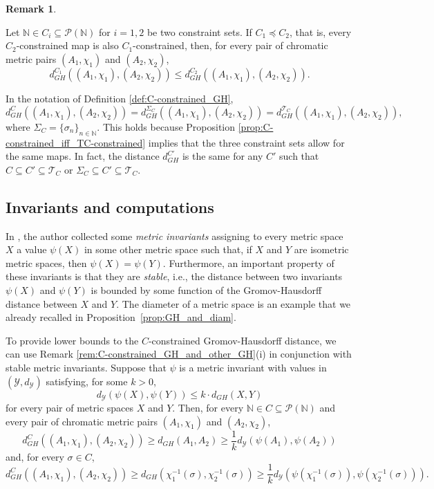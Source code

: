 \documentclass[8pt,a4paper,oneside,english,english]{article}
\theoremstyle{plain}
\theoremstyle
{plain}
\theoremstyle{definition}
\newtheorem{remark}[theorem]{Remark}%
\newcommand{\N}{\mathbb{N}}
\newcommand{\Tau}{\mathcal T}
\newcommand{\GH}{d_{GH}}
\newcommand{\MP}[1]{(A_{#1},\chi_{#1})}
\begin{document}
\begin{remark}
\begin{compactenum}[(i)]
        
        \item Let $\N\in C_i\subseteq\mathcal P(\N)$ for $i=1,2$ be two constraint sets. If $C_1\preceq C_2$, that is, every $C_2$-constrained map is also $C_1$-constrained, then, for every pair of chromatic metric pairs $\MP{1}$ and $\MP{2}$,
        \[
        \GH^{C_1}(\MP{1},\MP{2})\leq\GH^{C_2}(\MP{1},\MP{2}).
        \]
		
        \item 
        In the notation of Definition \ref{def:C-constrained_GH}, 
		\[
    		\GH^C(\MP{1},\MP{2})
            =\GH^{\Sigma_C}(\MP{1},\MP{2})
            =\GH^{\Tau_C}(\MP{1},\MP{2}),
		\]
		where $\Sigma_C=\{\sigma_n\}_{n\in\N}$. This holds because Proposition \ref{prop:C-constrained_iff_TC-constrained} implies that the three constraint sets allow for the same maps. In fact, the distance $\GH^{C'}$ is the same for any $C'$ such that $C\subseteq C' \subseteq \Tau_C$ or $\Sigma_C\subseteq C' \subseteq \Tau_C$.
	\end{compactenum}
\end{remark}


\subsection{Invariants and computations}\label{sub:invariants}

In \cite{Mem12}, the author collected some {\em metric invariants} assigning to every metric space $X$ a value $\psi(X)$ in some other metric space such that, if $X$ and $Y$ are isometric metric spaces, then $\psi(X)=\psi(Y)$. Furthermore, an important property of these invariants is that they are {\em stable}, i.e., the distance between two invariants $\psi(X)$ and $\psi(Y)$ is bounded by some function of the Gromov-Hausdorff distance between $X$ and $Y$.
The diameter of a metric space is an example that we already recalled in Proposition~\ref{prop:GH_and_diam}.

To provide lower bounds to the $C$-constrained Gromov-Hausdorff distance, we can use Remark \ref{rem:C-constrained_GH_and_other_GH}(i) in conjunction with stable metric invariants. Suppose that $\psi$ is a metric invariant with values in $(\mathcal Y,d_{\mathcal Y})$ satisfying, for some $k>0$,
\[
d_{\mathcal Y}(\psi(X),\psi(Y))\leq k\cdot\GH(X,Y)
\]
for every pair of metric spaces $X$ and $Y$. 
Then, for every $\N\in C\subseteq\mathcal P(\N)$ and every pair of chromatic metric pairs $\MP{1}$ and $\MP{2}$,
\begin{equation*} \label{eq:lower-bound_1}\GH^C(\MP{1},\MP{2})\geq\GH(A_1,A_2)\geq\frac{1}{k}d_{\mathcal Y}(\psi(A_1),\psi(A_2))
\end{equation*}
and, for every $\sigma\in C$,
\begin{equation*} \label{eq:lower-bound_2}
    \GH^C(\MP{1},\MP{2})\geq\GH(\chi_1^{-1}(\sigma),\chi_2^{-1}(\sigma))\geq\frac{1}{k}d_{\mathcal Y}(\psi(\chi_1^{-1}(\sigma)),\psi(\chi_2^{-1}(\sigma))).
\end{equation*}
\end{document}
